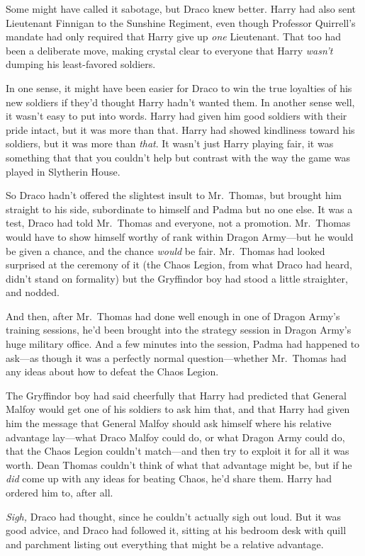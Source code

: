 Some might have called it sabotage, but Draco knew better. Harry had also sent
Lieutenant Finnigan to the Sunshine Regiment, even though Professor Quirrell's
mandate had only required that Harry give up \emph{one} Lieutenant. That too
had been a deliberate move, making crystal clear to everyone that Harry
\emph{wasn't} dumping his least-favored soldiers.

In one sense, it might have been easier for Draco to win the true loyalties of
his new soldiers if they'd thought Harry hadn't wanted them. In another
sense{\el} well, it wasn't easy to put into words. Harry had given him good
soldiers with their pride intact, but it was more than that. Harry had showed
kindliness toward his soldiers, but it was more than \emph{that}. It wasn't
just Harry playing fair, it was something that{\el} that you couldn't help
but contrast with the way the game was played in Slytherin House.

So Draco hadn't offered the slightest insult to Mr.~Thomas, but brought him
straight to his side, subordinate to himself and Padma but no one else. It was
a test, Draco had told Mr.~Thomas and everyone, not a promotion. Mr.~Thomas
would have to show himself worthy of rank within Dragon Army---but he would be
given a chance, and the chance \emph{would} be fair. Mr.~Thomas had looked
surprised at the ceremony of it (the Chaos Legion, from what Draco had heard,
didn't stand on formality) but the Gryffindor boy had stood a little
straighter, and nodded.

And then, after Mr.~Thomas had done well enough in one of Dragon Army's
training sessions, he'd been brought into the strategy session in Dragon Army's
huge military office. And a few minutes into the session, Padma had happened to
ask---as though it was a perfectly normal question---whether Mr.~Thomas had any
ideas about how to defeat the Chaos Legion.

The Gryffindor boy had said cheerfully that Harry had predicted that General
Malfoy would get one of his soldiers to ask him that, and that Harry had given
him the message that General Malfoy should ask himself where his relative
advantage lay---what Draco Malfoy could do, or what Dragon Army could do, that
the Chaos Legion couldn't match---and then try to exploit it for all it was
worth. Dean Thomas couldn't think of what that advantage might be, but if he
\emph{did} come up with any ideas for beating Chaos, he'd share them. Harry had
ordered him to, after all.

\emph{Sigh,} Draco had thought, since he couldn't actually sigh out loud. But
it was good advice, and Draco had followed it, sitting at his bedroom desk with
quill and parchment listing out everything that might be a relative advantage.

